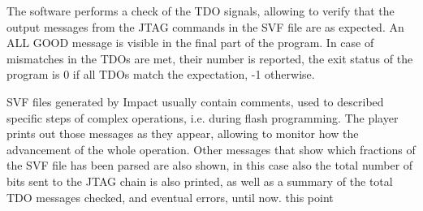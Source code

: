 The software performs a check of the TDO signals, allowing to verify
that the output messages from the JTAG commands in the SVF file are as
expected. An ALL GOOD message is visible in the final part of the program.
In case of mismatches in the TDOs are met, their number is reported, the
exit status of the program is 0 if all TDOs match the expectation, -1
otherwise.

SVF files generated by Impact usually contain comments, used to 
described specific steps of complex operations, i.e. during flash programming.
The player prints out those messages as they appear, allowing to monitor
how the advancement of the whole operation. Other messages that show
which fractions of the SVF file has been parsed are also shown, in this
case also the total number of bits sent to the JTAG chain is also 
printed, as well as a summary of the total TDO messages checked, and
eventual errors, until now.
this point 